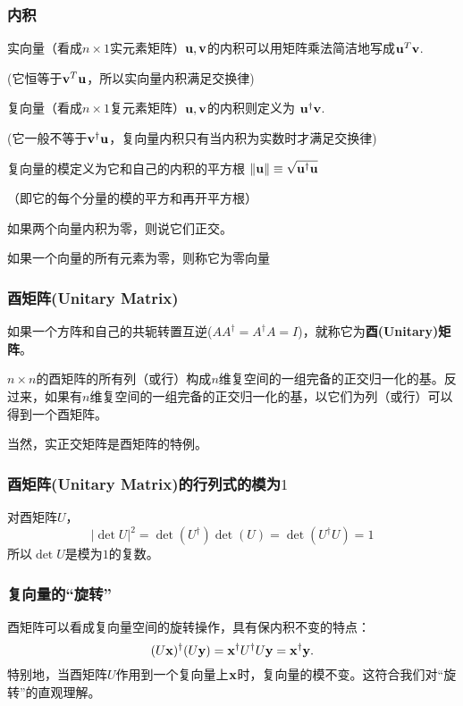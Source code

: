 \documentclass[CJK,13pt]{beamer}
\begin{document}
\begin{frame}
  \frametitle{内积}

  \bitem
  \item{实向量（看成$n\times 1$实元素矩阵）${\mathbf{u}},{\mathbf{v}}$的内积可以用矩阵乘法简洁地写成${\mathbf{u}}^T{\mathbf{v}}$.
  
  {\scriptsize (它恒等于${\mathbf{v}}^T {\mathbf{u}}$，所以实向量内积满足交换律)}}

\item{复向量（看成$n\times 1$复元素矩阵）${\mathbf{u}},{\mathbf{v}}$的内积则定义为 ${\mathbf{u}}^\dagger{\mathbf{v}}$.

  {\scriptsize (它一般不等于${\mathbf{v}}^\dagger {\mathbf{u}}$，复向量内积只有当内积为实数时才满足交换律)}}
\item{  复向量的模定义为它和自己的内积的平方根 $\lVert {\mathbf{u}}\rVert \equiv \sqrt{{\mathbf{u}}^\dagger{\mathbf{u}} } $

  {\scriptsize（即它的每个分量的模的平方和再开平方根）}}
\item{如果两个向量内积为零，则说它们正交。}
\item{如果一个向量的所有元素为零，则称它为零向量}
  \eitem
  
\end{frame}


\begin{frame}
  \frametitle{酉矩阵(Unitary Matrix)}
  如果一个方阵和自己的共轭转置互逆($AA^\dagger = A^\dagger A = I$)，就称它为{\bf \blue 酉(Unitary)矩阵}。

  \skipline

  $n\times n$的酉矩阵的所有列（或行）构成$n$维复空间的一组完备的正交归一化的基。反过来，如果有$n$维复空间的一组完备的正交归一化的基，以它们为列（或行）可以得到一个酉矩阵。

  \skipline
  
  当然，实正交矩阵是酉矩阵的特例。
\end{frame}

\begin{frame}
  \frametitle{酉矩阵(Unitary Matrix)的行列式的模为$1$}
  对酉矩阵$U$，
  $$  |\det U|^2 = \det(U^\dagger)\det(U) =  \det(U^\dagger U)  = 1$$
  所以$\det U$是模为$1$的复数。
\end{frame}

\begin{frame}
  \frametitle{复向量的``旋转''}
  酉矩阵可以看成复向量空间的旋转操作，具有保内积不变的特点：
  $$ (U{\mathbf{x}})^\dagger (U{\mathbf{y}}) = {\mathbf{x}}^\dagger U^\dagger U {\mathbf{y}} = {\mathbf{x}}^\dagger {\mathbf{y}}. $$
  特别地，当酉矩阵$U$作用到一个复向量上${\mathbf{x}}$时，复向量的模不变。这符合我们对“旋转”的直观理解。
  
\end{frame}
\end{document}
